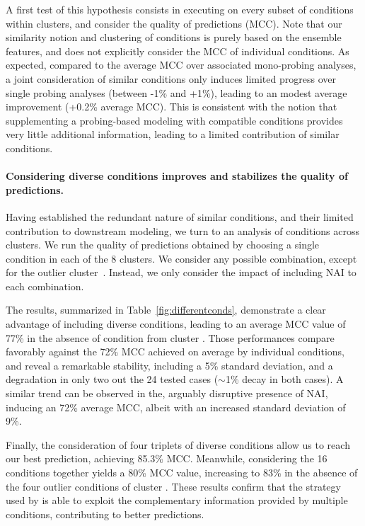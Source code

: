 \documentclass[a4,center,fleqn]{NAR}
\newcommand{\Software}[1]{\text{\ttfamily\bfseries #1}}
\newcommand{\OurTool}{\Software{IPANEMAP}\xspace}
\begin{document}
A first test of this hypothesis consists in executing \OurTool{} on every subset of conditions within clusters, and consider the quality of predictions (MCC). 
Note that our similarity notion and clustering of conditions is purely based on the ensemble features, and does not explicitly consider the MCC of individual conditions. 
As expected, compared to the average MCC over associated mono-probing analyses, a joint consideration of similar conditions only induces limited progress over single probing analyses (between -1\% and +1\%), leading to an modest average improvement (+0.2\% average MCC). This is consistent with the notion that supplementing a probing-based modeling with compatible conditions provides very little additional information, leading to a limited contribution of similar conditions. 



\paragraph{Considering diverse conditions improves and stabilizes the quality of predictions.} 
Having established the redundant nature of similar conditions, and their limited contribution to downstream modeling, we turn to an analysis of conditions across clusters.  We run \OurTool{} the quality of predictions obtained by choosing a single condition in each of the 8 clusters. We consider any possible combination, except for the outlier cluster~. Instead, we only consider the impact of including NAI to each combination.

The results, summarized in Table~\ref{fig:differentconds}, demonstrate a clear advantage of including diverse conditions, leading to an average MCC value of 77\% in the absence of condition from cluster . Those performances compare favorably against the 72\% MCC achieved on average by individual conditions, and reveal a remarkable stability, including a 5\% standard deviation, and a degradation in only two out the 24 tested cases ($\sim$1\% decay in both cases).  A similar trend can be observed in the, arguably disruptive presence of NAI, inducing an 72\% average MCC, albeit with an increased standard deviation of 9\%.

Finally, the consideration of four triplets of diverse conditions allow us to reach our best prediction, achieving 85.3\% MCC. Meanwhile, considering the 16 conditions together yields a 80\% MCC value, increasing to 83\% in the absence of the four outlier conditions of cluster . These results confirm that the strategy used by \OurTool{} is able to exploit the complementary information provided by multiple conditions, contributing to better predictions.
\end{document}
